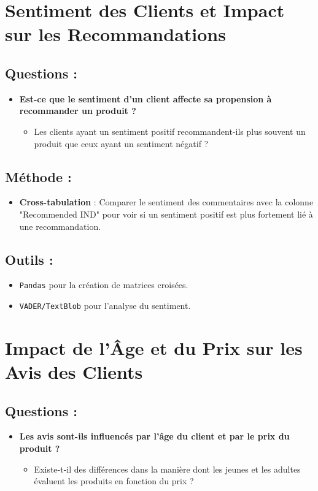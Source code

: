 \documentclass{article}
\begin{document}
	\section{Sentiment des Clients et Impact sur les Recommandations}
	
	\subsection{Questions :}
	\begin{itemize}
		\item \textbf{Est-ce que le sentiment d'un client affecte sa propension à recommander un produit ?}
		\begin{itemize}
			\item Les clients ayant un sentiment positif recommandent-ils plus souvent un produit que ceux ayant un sentiment négatif ?
		\end{itemize}
	\end{itemize}
	
	\subsection{Méthode :}
	\begin{itemize}
		\item \textbf{Cross-tabulation} : Comparer le sentiment des commentaires avec la colonne "Recommended IND" pour voir si un sentiment positif est plus fortement lié à une recommandation.
	\end{itemize}
	
	\subsection{Outils :}
	\begin{itemize}
		\item \texttt{Pandas} pour la création de matrices croisées.
		\item \texttt{VADER/TextBlob} pour l'analyse du sentiment.
	\end{itemize}
	
	\section{Impact de l'Âge et du Prix sur les Avis des Clients}
	
	\subsection{Questions :}
	\begin{itemize}
		\item \textbf{Les avis sont-ils influencés par l'âge du client et par le prix du produit ?}
		\begin{itemize}
			\item Existe-t-il des différences dans la manière dont les jeunes et les adultes évaluent les produits en fonction du prix ?
		\end{itemize}
	\end{itemize}
	
\end{document}

